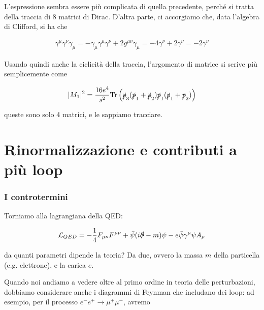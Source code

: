 \documentclass[11pt]{report}
\begin{document}
L'espressione sembra essere più complicata di quella precedente, perché si tratta della traccia di 8 matrici di Dirac. D'altra parte, ci accorgiamo che, data l'algebra di Clifford, si ha che 

\begin{align}
    \gamma^\mu \gamma^\nu \gamma_\mu = - \gamma_\mu\gamma^\mu\gamma^\nu + 2g^{\mu\nu}\gamma_\mu = -4\gamma^\nu + 2\gamma^\nu = -2\gamma^\nu
\end{align}

Usando quindi anche la ciclicità della traccia, l'argomento di matrice si scrive più semplicemente come 

\begin{align}
    \lvert M_1\rvert^2 = \frac{16e^4}{s^2}\text{Tr}\left(\slashed{p}_3(\slashed{p}_1+\slashed{p}_2)\slashed{p}_1(\slashed{p}_1+\slashed{p}_2)\right)
\end{align}

queste sono solo 4 matrici, e le sappiamo tracciare. 

\chapter{Rinormalizzazione e contributi a più loop}

\subsection{I controtermini}

Torniamo alla lagrangiana della QED: 

\begin{align}
    \mathcal{L}_{QED} = -\frac{1}{4}F_{\mu\nu}F^{\mu\nu} + \bar{\psi}(i\slashed{\partial} -m)\psi - e\bar{\psi}\gamma^\mu \psi A_\mu
\end{align}

da quanti parametri dipende la teoria? Da due, ovvero la massa \(m\) della particella (e.g. elettrone), e la carica \(e\). 

Quando noi andiamo a vedere oltre al primo ordine in teoria delle perturbazioni, dobbiamo considerare anche i diagrammi di Feynman che includano dei loop: ad esempio, per il processo \(e^-e^+ \rightarrow \mu^+\mu^-\), avremo 
\end{document}
